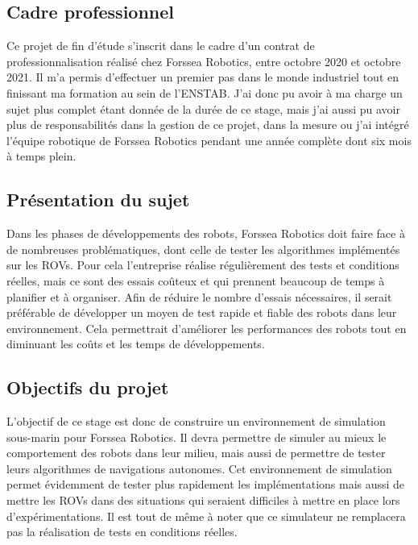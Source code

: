 \subsection{Cadre professionnel}
    Ce projet de fin d'étude s'inscrit dans le cadre d'un contrat de professionnalisation réalisé chez Forssea Robotics, entre octobre 2020 et octobre 2021. Il m'a permis d'effectuer un premier pas dans le monde industriel tout en finissant ma formation au sein de l'\gls{ENSTAB}. J'ai donc pu avoir à ma charge un sujet plus complet étant donnée de la durée de ce stage, mais j'ai aussi pu avoir plus de responsabilités dans la gestion de ce projet, dans la mesure ou j'ai intégré l'équipe robotique de Forssea Robotics pendant une année complète dont six mois à temps plein.

\subsection{Présentation du sujet}
    Dans les phases de développements des robots, Forssea Robotics doit faire face à de nombreuses problématiques, dont celle de tester les algorithmes implémentés sur les \gls{ROV}s. Pour cela l'entreprise réalise régulièrement des tests et conditions réelles, mais ce sont des essais coûteux et qui prennent beaucoup de temps à planifier et à organiser. Afin de réduire le nombre d'essais nécessaires, il serait préférable de développer un moyen de test rapide et fiable des robots dans leur environnement. Cela permettrait d'améliorer les performances des robots tout en diminuant les coûts et les temps de développements.

\subsection{Objectifs du projet}
    L'objectif de ce stage est donc de construire un environnement de simulation sous-marin pour Forssea Robotics. Il devra permettre de simuler au mieux le comportement des robots dans leur milieu, mais aussi de permettre de tester leurs algorithmes de navigations autonomes. Cet environnement de simulation permet évidemment de tester plus rapidement les implémentations mais aussi de mettre les \gls{ROV}s dans des situations qui seraient difficiles à mettre en place lors d'expérimentations. Il est tout de même à noter que ce simulateur ne remplacera pas la réalisation de tests en conditions réelles.

   